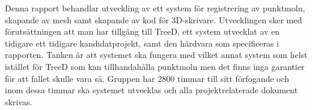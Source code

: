 Denna rapport behandlar utveckling av ett system för registrering av punktmoln, skapande av mesh samt skapande av kod för 3D-skrivare. Utvecklingen sker med förutsättningen att man har tillgång till TreeD, ett system utvecklat av en tidigare ett tidigare kandidatprojekt, samt den hårdvara som specificeras i rapporten. Tanken är att systemet ska fungera med vilket annat system som helst istället för TreeD som kan tillhandahålla punktmoln men det finns inga garantier för att fallet skulle vara så. Gruppen har 2800 timmar till sitt förfogande och inom dessa timmar ska systemet utvecklas och alla projektrelaterade dokument skrivas. 



